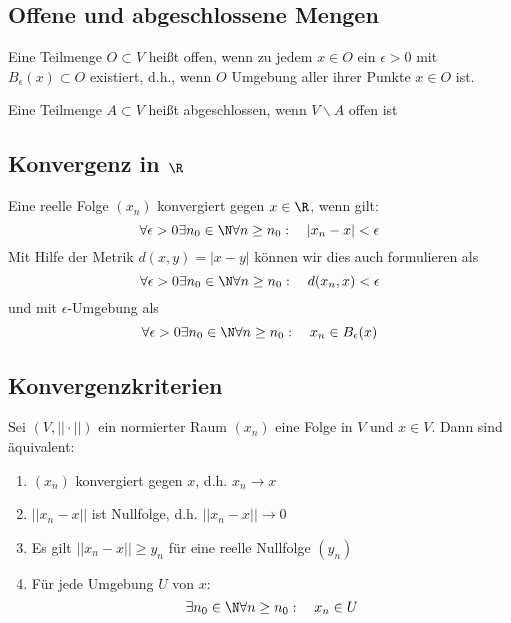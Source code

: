 	\subsection{Offene und abgeschlossene Mengen}
		\begin{Definition} 
			Eine Teilmenge $O\subset V$ heißt offen, wenn zu jedem $x\in O$ ein $\epsilon>0$ mit $B_\epsilon(x)\subset O$ existiert, d.h., wenn $O$ Umgebung aller ihrer Punkte $x\in O$ ist.
		\end{Definition}
		\begin{Definition} 
			Eine Teilmenge $A\subset V$ heißt abgeschlossen, wenn $V\backslash A$ offen ist
		\end{Definition}
	\subsection{Konvergenz in $\R$}
		\begin{Definition} [ Konvergenz]
			Eine reelle Folge $(x_n)$ konvergiert gegen $x\in\R$, wenn gilt:
			$$
				\forall \epsilon > 0 \exists n_0 \in \N \forall n \geq n_0: \quad |x_n - x| < \epsilon
			$$
			Mit Hilfe der Metrik $d(x, y) = |x-y|$ können wir dies auch formulieren als
			$$
				\forall \epsilon > 0 \exists n_0 \in \N \forall n \geq n_0: \quad d(x_n, x) < \epsilon
			$$
			und mit $\epsilon$-Umgebung als
			$$
				\forall \epsilon > 0 \exists n_0 \in \N \forall n \geq n_0: \quad x_n \in B_\epsilon(x)
			$$
		\end{Definition}
	\subsection{Konvergenzkriterien}
		\begin{Lemma} [ ]
			Sei $(V, ||\cdot||)$ ein normierter Raum $(x_n)$ eine Folge in $V$ und $x \in V$. \newline
			Dann sind äquivalent:
			\begin{enumerate}
				\item $(x_n)$ konvergiert gegen $x$, d.h. $x_n\to x$
				\item $||x_n - x||$ ist Nullfolge, d.h. $||x_n - x||\to 0$
				\item Es gilt $||x_n - x||\geq y_n$ für eine reelle Nullfolge $(y_n)$
				\item Für jede Umgebung $U$ von $x$:
					$$
						\exists n_0 \in \N \forall n \geq n_0: \quad x_n \in U
					$$
			\end{enumerate}
		\end{Lemma}
